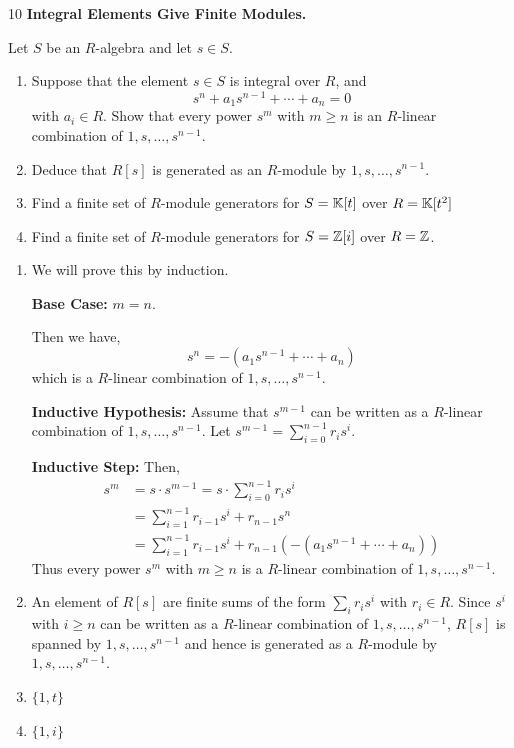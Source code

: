 \documentclass[Notebook.tex]{subfiles}
\begin{document}
\newpage 

\begin{problem}{10} \textbf{Integral Elements Give Finite Modules.} 
    
    Let $S$ be an $R$-algebra and let $s\in S$.
    \begin{enumerate}
        \item Suppose that the element $s\in S$ is integral over $R$, and 
        \[
        s^n+a_1s^{n-1}+\cdots+a_n=0
        \]
        with $a_i\in R$. Show that every power $s^m$ with $m\geq n$ is an $R$-linear combination of $1,s,\ldots,s^{n-1}$.
        \item Deduce that $R[s]$ is generated as an $R$-module by $1,s,\ldots,s^{n-1}$.
        \item Find a finite set of $R$-module generators for $S=\mathbb K[t]$ over $R=\mathbb K[t^2]$
        \item Find a finite set of $R$-module generators for $S=\mathbb Z[i]$ over $R=\mathbb Z$. 
    \end{enumerate}
\end{problem}

\begin{solution}
    \bbni
    \begin{enumerate}
        \item We will prove this by induction. 
        
        \textbf{Base Case:} $m = n$.

        Then we have, 
        \[s^n = - (a_1s^{n-1}+\cdots+a_n)\]
        which is a $R$-linear combination of $1, s, \ldots, s^{n-1}$. 

        \textbf{Inductive Hypothesis:} Assume that $s^{m-1}$ can be written as a $R$-linear combination of $1, s, \ldots, s^{n-1}$. Let $s^{m-1} = \sum_{i = 0}^{n-1} r_i s^i$. 

        \textbf{Inductive Step:} Then, 
        \begin{align*}
            s^m &= s \cdot s^{m-1} = s \cdot \sum_{i = 0}^{n-1} r_i s^i  \\ 
            &= \sum_{i = 1}^{n-1} r_{i-1} s^{i} + r_{n-1}s^n  \\ 
            &= \sum_{i = 1}^{n-1} r_{i-1} s^{i} + r_{n-1} \left(- (a_1s^{n-1}+\cdots+a_n)\right)
        \end{align*}
        Thus every power $s^m$ with $m \geq n$ is a $R$-linear combination of $1, s, \ldots, s^{n-1}$.

        \item An element of $R[s]$ are finite sums of the  form $\sum_i r_is^i $ with $r_i \in R$. Since $s^i$ with $i \geq n$ can be written as a $R$-linear combination of $1, s, \ldots, s^{n-1}$, $R[s]$ is spanned by $1, s, \ldots, s^{n-1}$ and hence is generated as a $R$-module by $1, s, \ldots, s^{n-1}$. 
        
        \item $\{1, t\}$ 
        
        \item $\{1, i\}$
    \end{enumerate}
\end{solution}
\end{document}
